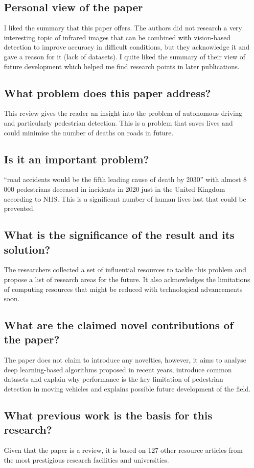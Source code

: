 \documentclass[11pt,a4paper]{article}
\begin{document}
\subsection*{Personal view of the paper}
I liked the summary that this paper offers. The authors did not research a very interesting topic of infrared images that can be combined with vision-based detection to improve accuracy in difficult conditions, but they acknowledge it and gave a reason for it (lack of datasets). I quite liked the summary of their view of future development which helped me find research points in later publications.
\subsection*{What problem does this paper address?}
This review gives the reader an insight into the problem of autonomous driving and particularly pedestrian detection. This is a problem that saves lives and could minimise the number of deaths on roads in future.
\subsection*{Is it an important problem?}
“road accidents would be the fifth leading cause of death by 2030” \cite{kohli2019enabling} with almost 8 000 pedestrians deceased in incidents in 2020 just in the United Kingdom according to NHS. This is a significant number of human lives lost that could be prevented.
\subsection*{What is the significance of the result and its solution?}
The researchers collected a set of influential resources to tackle this problem and propose a list of research areas for the future. It also acknowledges the limitations of computing resources that might be reduced with technological advancements soon.
\subsection*{What are the claimed novel contributions of the paper?}
The paper does not claim to introduce any novelties, however, it aims to analyse deep learning-based algorithms proposed in recent years, introduce common datasets and explain why performance is the key limitation of pedestrian detection in moving vehicles and explains possible future development of the field.
\subsection*{What previous work is the basis for this research?}
Given that the paper is a review, it is based on 127 other resource articles from the most prestigious research facilities and universities.
\end{document}
